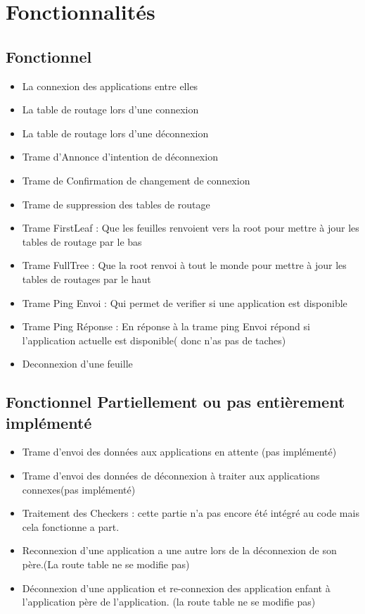 \documentclass[a4paper,titlepage]{report}
\begin{document}
\pagebreak
\section{Fonctionnalités}
\subsection{Fonctionnel}
\begin{itemize}
\item La connexion des applications entre elles
\item La table de routage lors d'une connexion
\item La table de routage lors d'une déconnexion
\item Trame d'Annonce d'intention de déconnexion
\item Trame de Confirmation de changement de connexion
\item Trame de suppression des tables de routage
\item Trame FirstLeaf : Que les feuilles renvoient vers la root pour mettre à jour les tables de routage par le bas
\item Trame FullTree : Que la root renvoi à tout le monde pour mettre à jour les tables de routages par le haut
\item Trame Ping Envoi : Qui permet de verifier si une application est disponible
\item Trame Ping Réponse : En réponse à la trame ping Envoi répond si l'application actuelle est disponible( donc n'as pas de taches)
\item Deconnexion d'une feuille
\end{itemize}

\subsection{Fonctionnel Partiellement ou pas entièrement implémenté}
\begin{itemize}
\item Trame  d'envoi des données aux applications en attente (pas implémenté)
\item Trame d'envoi des données de déconnexion à traiter aux applications connexes(pas implémenté)
\item Traitement des Checkers : cette partie n'a pas encore été intégré au code mais cela fonctionne a part.
\item Reconnexion d'une application a une autre lors de la déconnexion de son père.(La route table ne se modifie pas)
\item Déconnexion d'une application et re-connexion des application enfant à l'application père de l'application. (la route table ne se modifie pas)
\end{itemize}
\end{document}
